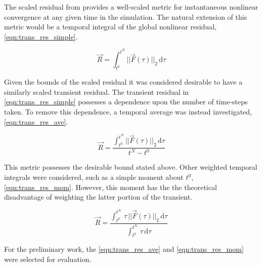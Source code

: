 The scaled residual from  provides a well-scaled metric for instantaneous nonlinear convergence at any given time in the simulation.
The natural extension of this metric would be a temporal integral of the global nonlinear residual, \eqref{eqn:trans_res_simple}.

\begin{equation}
\label{eqn:trans_res_simple}
\vec{R} = \int_{t^{0}}^{t^{N}} ||\vec{F}(\tau)||_2 \,\mathrm{d} \tau
\end{equation}

Given the bounds of the scaled residual it was considered desirable to have a similarly scaled transient residual.
The transient residual in \eqref{eqn:trans_res_simple} possesses a dependence upon the number of time-steps taken.
To remove this dependence, a temporal average was instead investigated, \eqref{eqn:trans_res_ave}.

\begin{equation}
\label{eqn:trans_res_ave}
\vec{R} = \frac{\int_{t^{0}}^{t^{N}} ||\vec{F}(\tau)||_2 \,\mathrm{d} \tau}{t^{N} - t^{0}}
\end{equation}

This metric possesses the desirable bound stated above.
Other weighted temporal integrals were considered, such as a simple moment about $t^{0}$, \eqref{eqn:trans_res_mom}.
However, this moment has the the theoretical disadvantage of weighting the latter portion of the transient.

\begin{equation}
\label{eqn:trans_res_mom}
\vec{R} = \frac{\int_{t^{0}}^{t^{N}} \,\tau\,||\vec{F}(\tau)||_2 \,\mathrm{d} \tau}{\int_{t^{0}}^{t^{N}} \,\tau \,\mathrm{d} \tau}
\end{equation}

For the preliminary work, the \eqref{eqn:trans_res_ave} and \eqref{eqn:trans_res_mom} were selected for evaluation.

